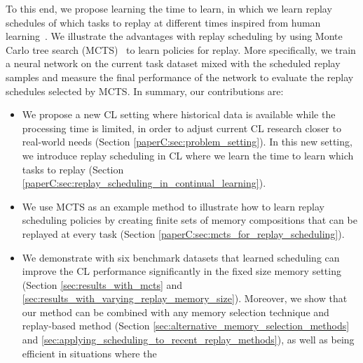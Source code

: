 To this end, we propose learning the time to learn, in which we learn replay schedules of which tasks to replay at different times inspired from human learning~. 
We illustrate the advantages with replay scheduling by using Monte Carlo tree search (MCTS)~ to learn policies for replay. 
More specifically, we train a neural network on the current task dataset mixed with the scheduled replay samples and measure the final performance of the network to evaluate the replay schedules selected by MCTS. 
In summary, our contributions are:
\begin{itemize}[topsep=1pt,] %
    \setlength\itemsep{0.1mm}
    \item We propose a new CL setting where historical data is available while the processing time is limited, in order to adjust current CL research closer to real-world needs (Section \ref{paperC:sec:problem_setting}). In this new setting, we introduce replay scheduling in CL where we learn the time to learn which tasks to replay (Section \ref{paperC:sec:replay_scheduling_in_continual_learning}).
    \item We use MCTS as an example method to illustrate how to learn replay scheduling policies by creating finite sets of memory compositions that can be replayed at every task (Section \ref{paperC:sec:mcts_for_replay_scheduling}).
    \item We demonstrate with six benchmark datasets that learned scheduling can improve the CL performance significantly in the fixed size memory setting (Section \ref{sec:results_with_mcts} and \ref{sec:results_with_varying_replay_memory_size}). Moreover, we show that our method can be combined with any memory selection technique and replay-based method (Section \ref{sec:alternative_memory_selection_methods} and \ref{sec:applying_scheduling_to_recent_replay_methods}), as well as being efficient in situations where the 

\end{itemize}

